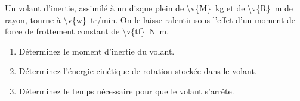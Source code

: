 Un volant d'inertie, assimilé à un disque plein de \qty{\v{M}}{kg} et de \qty{\v{R}}{m} de rayon, tourne à \qty{\v{w}}{tr/min}. On le laisse ralentir sous l'effet d'un moment de force de frottement constant de \qty{\v{tf}}{N.m}.

\begin{enumerate}[label=\alph*)]
    \item Déterminez le moment d'inertie du volant.
    \item Déterminez l'énergie cinétique de rotation stockée dans le volant.
    \item Déterminez le temps nécessaire pour que le volant s'arrête.
\end{enumerate}
